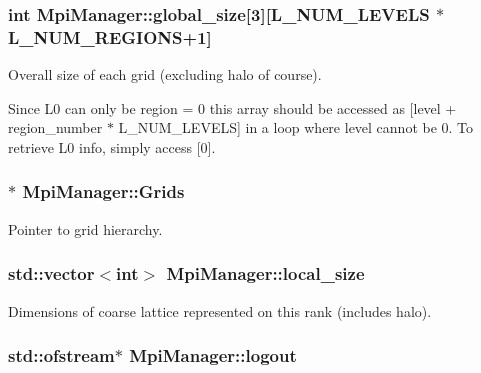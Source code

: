\subsubsection[{\texorpdfstring{global\+\_\+size}{global_size}}]{\setlength{\rightskip}{0pt plus 5cm}int Mpi\+Manager\+::global\+\_\+size\mbox{[}3\mbox{]}\mbox{[}{\bf L\+\_\+\+N\+U\+M\+\_\+\+L\+E\+V\+E\+LS} $\ast${\bf L\+\_\+\+N\+U\+M\+\_\+\+R\+E\+G\+I\+O\+NS}+1\mbox{]}}\hypertarget{class_mpi_manager_a3cdf6e1ce19f22daa9e84bc88bf4382d}{}\label{class_mpi_manager_a3cdf6e1ce19f22daa9e84bc88bf4382d}


Overall size of each grid (excluding halo of course). 

Since L0 can only be region = 0 this array should be accessed as \mbox{[}level + region\+\_\+number $\ast$ L\+\_\+\+N\+U\+M\+\_\+\+L\+E\+V\+E\+LS\mbox{]} in a loop where level cannot be 0. To retrieve L0 info, simply access \mbox{[}0\mbox{]}. 
\subsubsection[{\texorpdfstring{Grids}{Grids}}]{$\ast$ Mpi\+Manager\+::\+Grids}\hypertarget{class_mpi_manager_ad5ce72a2047a4cbb38f76d71c96571d8}{}\label{class_mpi_manager_ad5ce72a2047a4cbb38f76d71c96571d8}


Pointer to grid hierarchy. 

\subsubsection[{\texorpdfstring{local\+\_\+size}{local_size}}]{\setlength{\rightskip}{0pt plus 5cm}std\+::vector$<$int$>$ Mpi\+Manager\+::local\+\_\+size}\hypertarget{class_mpi_manager_ad4a918a4cd19e644ff3295b2854fc6af}{}\label{class_mpi_manager_ad4a918a4cd19e644ff3295b2854fc6af}


Dimensions of coarse lattice represented on this rank (includes halo). 

\subsubsection[{\texorpdfstring{logout}{logout}}]{\setlength{\rightskip}{0pt plus 5cm}std\+::ofstream$\ast$ Mpi\+Manager\+::logout}\hypertarget{class_mpi_manager_a9a0dd93f57d78f568048197c95311832}{}\label{class_mpi_manager_a9a0dd93f57d78f568048197c95311832}


